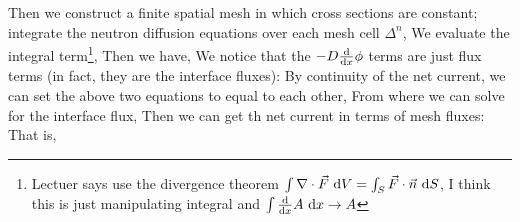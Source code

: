 \documentclass{school-22.211-notes}
\begin{document}
Then we construct a finite spatial mesh in which cross sections are constant; integrate the neutron diffusion equations over each mesh cell $\Delta^n$,
We evaluate the integral term\footnote{Lectuer says use the divergence theorem $\int \nabla \cdot \vec{F} \mbox{ }\mathrm{d} V = \int_S \vec{F} \cdot \vec{n} \mbox{ }\mathrm{d} S$, I think this is just manipulating integral and $\int \frac{\mathrm{d}}{\mathrm{d}x} A \mbox{ }\mathrm{d} x \to A$}, 
Then we have,
We notice that the $-D \frac{\mathrm{d}}{\mathrm{d}x} \phi$ terms are just flux terms (in fact, they are the interface fluxes):
By continuity of the net current, we can set the above two equations to equal to each other, 
From where we can solve for the interface flux, 
Then we can get th net current in terms of mesh fluxes: 
That is, 
\end{document}
